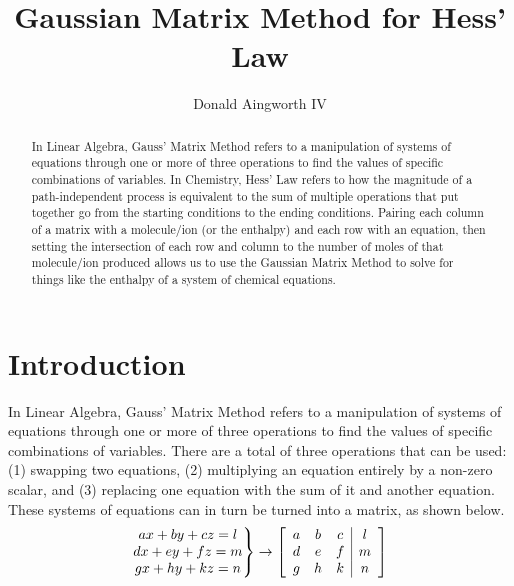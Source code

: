 \documentclass[11pt]{article}
\title{Gaussian Matrix Method for Hess' Law}
\author{Donald Aingworth IV}
\date{}
\begin{document}
    \maketitle

    \begin{abstract}
        In Linear Algebra, Gauss' Matrix Method refers to a manipulation of systems of equations through one or more of three operations to find the values of specific combinations of variables.
        In Chemistry, Hess' Law refers to how the magnitude of a path-independent process is equivalent to the sum of multiple operations that put together go from the starting conditions to the ending conditions.
        Pairing each column of a matrix with a molecule/ion (or the enthalpy) and each row with an equation, then setting the intersection of each row and column to the number of moles of that molecule/ion produced allows us to use the Gaussian Matrix Method to solve for things like the enthalpy of a system of chemical equations.
    \end{abstract}

    \section{Introduction}
        In Linear Algebra, Gauss' Matrix Method refers to a manipulation of systems of equations through one or more of three operations to find the values of specific combinations of variables.
        There are a total of three operations that can be used: (1) swapping two equations, (2) multiplying an equation entirely by a non-zero scalar, and (3) replacing one equation with the sum of it and another equation.
        These systems of equations can in turn be turned into a matrix, as shown below.
        \begin{equation}
            \left.
            \begin{matrix}
                ax + by + cz = l\\
                dx + ey + fz = m\\
                gx + hy + kz = n
            \end{matrix}
            \right\} \rightarrow
            \left[ \begin{array}{c c c | c}
                a & b & c & l\\
                d & e & f & m\\
                g & h & k & n
            \end{array} \right]
        \end{equation}
\end{document}
